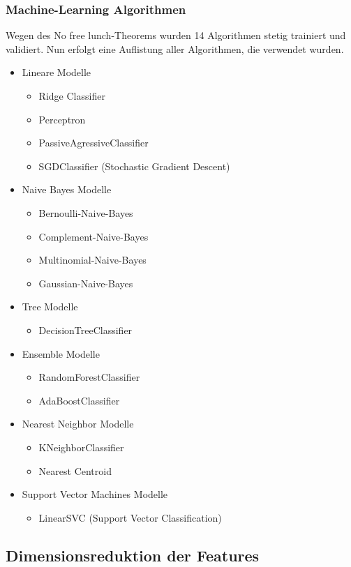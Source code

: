 \subsubsection{Machine-Learning Algorithmen}
Wegen des \glqq No free lunch\grqq{}-Theorems wurden 14 Algorithmen stetig trainiert und validiert.
Nun erfolgt eine Auflistung aller Algorithmen, die verwendet wurden.
\begin{itemize}
	\item Lineare Modelle
	\begin{itemize}
		\item Ridge Classifier
		\item Perceptron
		\item PassiveAgressiveClassifier
		\item SGDClassifier (Stochastic Gradient Descent)
	\end{itemize}
	\item Naive Bayes Modelle
	\begin{itemize}
		\item Bernoulli-Naive-Bayes
		\item Complement-Naive-Bayes
		\item Multinomial-Naive-Bayes
		\item Gaussian-Naive-Bayes
	\end{itemize}
	\item Tree Modelle
	\begin{itemize}
		\item DecisionTreeClassifier
	\end{itemize}
	\item Ensemble Modelle
	\begin{itemize}
		\item RandomForestClassifier
		\item AdaBoostClassifier
	\end{itemize}
	\item Nearest Neighbor Modelle
	\begin{itemize}
		\item KNeighborClassifier
		\item Nearest Centroid
	\end{itemize}
	\item Support Vector Machines Modelle
	\begin{itemize}
		\item LinearSVC (Support Vector Classification)
	\end{itemize}
\end{itemize}
\subsection{Dimensionsreduktion der Features}
